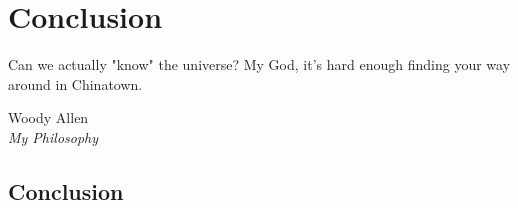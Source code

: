 \chapter{Conclusion}
\label{chap:conclusion}

\epigraph{Can we actually "know" the universe? My God, it's hard
  enough finding your way around in Chinatown.}{Woody Allen\\\emph{My
    Philosophy}}
\clearpage

\section{Conclusion}
